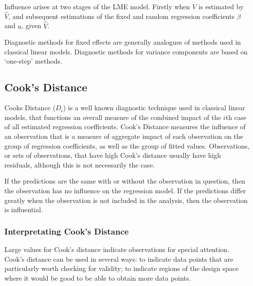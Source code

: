 \documentclass[12pt, a4paper]{report}
\theoremstyle{plain}
\theoremstyle{definition}
\theoremstyle{remark}
\begin{document}
Influence arises at two stages of the LME model. Firstly when $V$ is estimated by $\hat{V}$, and subsequent
estimations of the fixed and random regression coefficients $\beta$ and $u$, given $\hat{V}$.

Diagnostic methods for fixed effects are generally analogues of methods used in classical linear models.
Diagnostic methods for variance components are based on `one-step' methods. 

	\subsection{Cook's Distance}
 Cooks Distance ($D_{i}$) is a well known diagnostic technique used in classical linear models, that functions an overall measure of the combined impact of the $i$th case of all estimated regression coefficients. Cook's Distance measures the influence of an observation that is a measure of aggregate impact of each observation on the group of regression coefficients, as well as the group of fitted values.	
	Observations, or sets of observations, that have high Cook's distance usually have high residuals, although this is not necessarily the case.
		

	If the predictions are the same with or without the observation in question, then the observation has no influence on the regression model. If the predictions differ greatly when the observation is not included in the analysis, then the observation is influential.
	
	
	\subsubsection{Interpretating Cook's Distance}
	Large values for Cook's distance indicate observations for special attention. Cook's distance can be used in several ways: to indicate data points that are particularly worth checking for validity; to indicate regions of the design space where it would be good to be able to obtain more data points.
	
\end{document}
